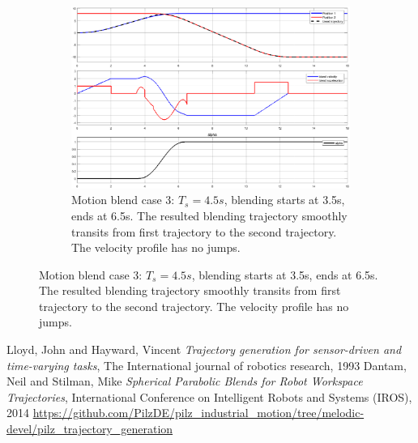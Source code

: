 \documentclass{article}
\begin{document}
\begin{figure}[ht]
	\begin{subfigure}[ht]{0.8\textwidth}%
		\centering
		\includegraphics[width=0.8\columnwidth]{figure/blend_case_3.eps}%
		\caption{Motion blend case 3: $T_s = 4.5s$, blending starts at 3.5s, ends at 6.5s. The resulted blending trajectory smoothly transits from first trajectory to the second trajectory. The velocity profile has no jumps.}%
		\label{blend_case_3}%
	\end{subfigure}
	
\end{figure}


\begin{thebibliography}{9}
Lloyd, John and Hayward, Vincent \textit{Trajectory generation for sensor-driven and time-varying tasks}, The International journal of robotics research, 1993
Dantam, Neil and Stilman, Mike \textit{Spherical Parabolic Blends for Robot Workspace Trajectories}, International Conference on Intelligent Robots and Systems (IROS), 2014
\url{https://github.com/PilzDE/pilz_industrial_motion/tree/melodic-devel/pilz_trajectory_generation}
\end{thebibliography}
\end{document}

